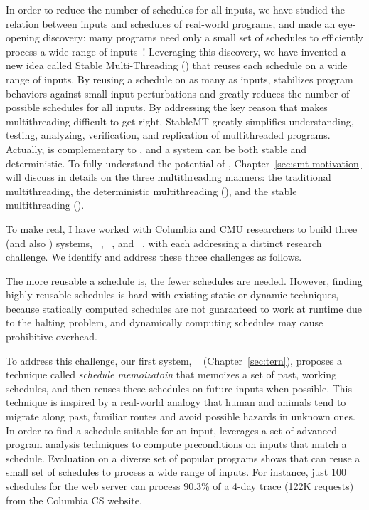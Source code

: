 In order to reduce the number of schedules for all inputs, we have studied the
relation between inputs and schedules of real-world programs, and made an
eye-opening discovery: many programs need only a small set of schedules to
efficiently process a wide range of inputs~\cite{smt:cacm}! Leveraging this
discovery, we have invented a new idea called Stable Multi-Threading (\smt)
that reuses each schedule on a wide range of inputs. By reusing a schedule on as
many as inputs, \smt stabilizes program behaviors against small input
perturbations and greatly reduces the number of possible schedules for all
inputs. By addressing the key reason that makes multithreading difficult to get
right, StableMT greatly simplifies understanding, testing, analyzing,
verification, and replication of multithreaded programs. Actually, \smt is
complementary to \dmt,
and a system can be both stable and deterministic. To fully understand the
potential of \smt, Chapter~\ref{sec:smt-motivation} will discuss in details on
the three multithreading manners: the traditional multithreading, the
deterministic multithreading (\dmt), and the stable multithreading (\smt).


To make \smt real, I have worked with Columbia and CMU researchers to build
three \smt (and also \dmt) systems, \tern~\cite{cui:tern:osdi10},
\peregrine~\cite{peregrine:sosp11}, and \parrot~\cite{parrot:sosp13}, with each
addressing a distinct research challenge. We identify and address these three
challenges as follows.

 The more reusable a schedule is, the fewer schedules are needed.
However, finding highly reusable schedules is hard with existing static or
dynamic techniques, because statically computed schedules are not guaranteed to
work at runtime due to the halting problem, and dynamically computing schedules
may cause prohibitive overhead.

To address this challenge, our first \smt system, \tern~\cite{cui:tern:osdi10}
(Chapter~\ref{sec:tern}), proposes a technique called \emph{schedule
memoizatoin} that memoizes a set of past, working schedules, and then reuses
these schedules on future inputs when possible. This technique is inspired by a
real-world analogy that human and animals tend to migrate along past, familiar
routes and avoid possible hazards in unknown ones. In order to find a schedule
suitable for an input, \tern leverages a set of advanced program analysis
techniques to compute preconditions on inputs that match a schedule. Evaluation
on a diverse set of popular programs shows that \tern can reuse a small set of
schedules to process a wide range of inputs. For instance, just 100 schedules
for the \apache web server can process 90.3\% of a 4-day trace (122K requests)
from the Columbia CS website.

